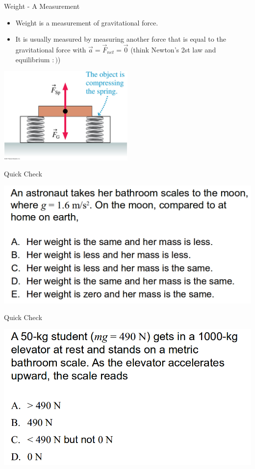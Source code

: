 \documentclass{beamer}
\newcommand{\red}[1]{{\color{red}{#1}}}
\newcommand{\checkL}[2]{\begin{textblock*}{1cm}(#1,#2){\Large \red{\Checkmark}}\end{textblock*}}
\begin{document}
\begin{frame}{Weight - A Measurement}
\begin{itemize}
   \item Weight is a measurement of gravitational force.
   \item It is usually measured by measuring another force that is equal to the gravitational force with $\vec{a}=\vec{F}_{net} = \vec{0}$ (think Newton's 2st law and equilibrium $:)$)
\end{itemize}
\begin{center}
   \includegraphics[width=0.5\textwidth]{../figures/06_09_Figure.jpg}
\end{center}
\end{frame}

\begin{frame}{Quick Check}
\begin{center}
   \includegraphics[width=\textwidth]{../figures/QC6_7.png}
\end{center}
\only<2>{\checkL{1.0cm}{5.3cm}}
\end{frame}

\begin{frame}{Quick Check}
\begin{center}
   \includegraphics[width=\textwidth]{../figures/QC6_8.png}
\end{center}
\only<2>{\checkL{1.0cm}{4.8cm}}
\end{frame}
\end{document}
